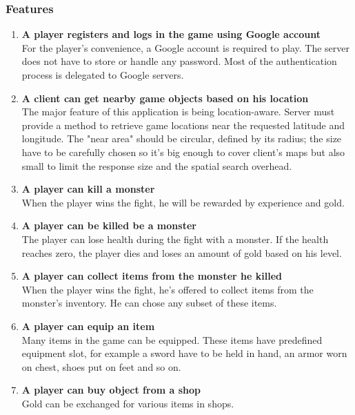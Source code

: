 		\subsubsection*{Features}
		\begin{enumerate}
			\item \textbf{A player registers and logs in the game using Google account} \\
			For the player's convenience, a Google account is required to play. The server does not have to store or handle any password. Most of the authentication process is delegated to Google servers.
			
			\item \textbf{A client can get nearby game objects based on his location} \\
			The major feature of this application is being location-aware. Server must provide a method to retrieve game locations near the requested latitude and longitude. The "near area" should be circular, defined by its radius; the size have to be carefully chosen so it's big enough to cover client's maps but also small to limit the response size and the spatial search overhead.
			
			\item \textbf{A player can kill a monster} \\
			When the player wins the fight, he will be rewarded by experience and gold. 			
			
			\item \textbf{A player can be killed be a monster} \\
			The player can lose health during the fight with a monster. If the health reaches zero, the player dies and loses an amount of gold based on his level.
			
			\item \textbf{A player can collect items from the monster he killed} \\
			When the player wins the fight, he's offered to collect items from the monster's inventory. He can chose any subset of these items.
			
			\item \textbf{A player can equip an item} \\	
			Many items in the game can be equipped. These items have predefined equipment slot, for example a sword have to be held in hand, an armor worn on chest, shoes put on feet and so on.
						
			\item \textbf{A player can buy object from a shop} \\
			Gold can be exchanged for various items in shops.
			

\end{enumerate}
